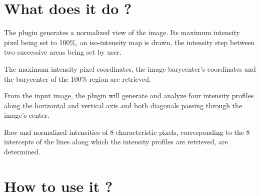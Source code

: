 \documentclass[a4paper, 11pt]{report}%
\begin{document}
\newpage

\section{What does it do ?}
\label{sec:gfir-what}

\begin{enumerate*}
	\item The plugin generates a normalized view of the image. Its maximum intensity pixel being set to 100\%, an iso-intensity map is drawn, the intensity step between two successive areas being set by user.
	\item The maximum intensity pixel coordinates, the image barycenter's coordinates and the barycenter of the 100\% region are retrieved.
	\item From the input image, the plugin will generate and analyze four intensity profiles along the horizontal and vertical axis and both diagonals passing through the image's center.
	\item Raw and normalized intensities of 8 characteristic pixels, corresponding to the 8 intercepts of the lines along which the intensity profiles are retrieved, are determined.
\end{enumerate*}

\section{How to use it ?}
\label{sec:gfir-how}
\end{document}
